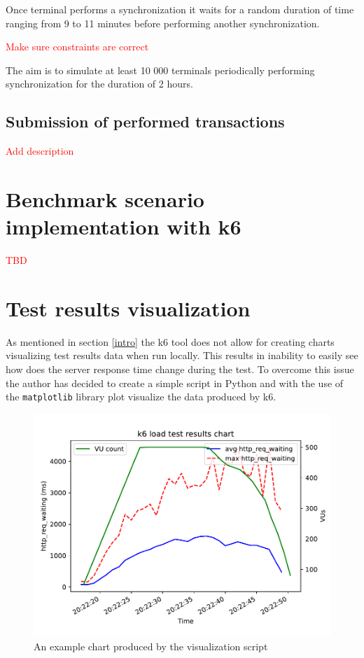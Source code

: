 \documentclass[12pt, a4paper]{article}
\newcommand\todo[1]{\textcolor{red}{#1}}
\let\oldsection\section
\renewcommand\section{\clearpage\oldsection}
\begin{document}
Once terminal performs a synchronization it waits for a random duration of time ranging from 9 to 11 minutes before performing another synchronization.

\todo{Make sure constraints are correct}

The aim is to simulate at least 10 000 terminals periodically performing synchronization for the duration of 2 hours.

\subsection{Submission of performed transactions}

\todo{Add description}


\section{Benchmark scenario implementation with k6}

\todo{TBD}


\section{Test results visualization}

As mentioned in section \ref{intro} the k6 tool does not allow for creating charts visualizing test results data when run locally.
This results in inability to easily see how does the server response time change during the test.
To overcome this issue the author has decided to create a simple script in Python and with the use of the \texttt{matplotlib} library plot visualize the data produced by k6.

\begin{figure}[!ht]
    \centering 
    \includegraphics[width=1\textwidth]{pdf/visualizer-example.pdf}
    \caption{An example chart produced by the visualization script}
\end{figure}
\end{document}
